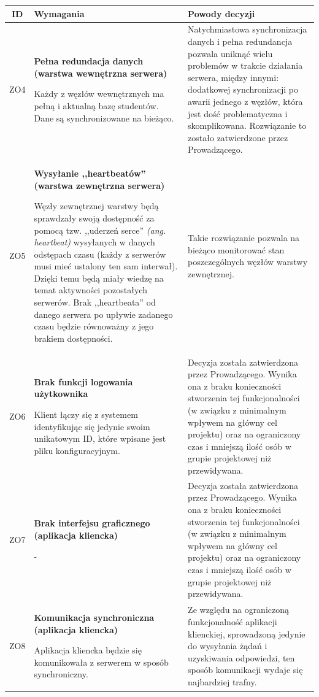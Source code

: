 \pagebreak

\begin{tabularx}{\textwidth}{|c|X|X|}
\hline
\textbf{ID} & \textbf{Wymagania}  & \textbf{Powody decyzji} \\
\hline
\label{z:ZO4} ZO4 &  \textbf{Pełna redundacja danych (warstwa wewnętrzna serwera)}

Każdy z węzłów wewnętrznych ma pełną i aktualną bazę studentów. Dane są synchronizowane na bieżąco. & 
Natychmiastowa synchronizacja danych i pełna redundancja pozwala uniknąć wielu problemów w trakcie działania serwera, między innymi: dodatkowej synchronizacji po awarii jednego z węzłów, która jest dość problematyczna i skomplikowana. Rozwiązanie to zostało zatwierdzone przez Prowadzącego.\\
\hline

\label{z:ZO5} ZO5 &  \textbf{Wysyłanie ,,heartbeatów'' (warstwa zewnętrzna serwera)}

Węzły zewnętrznej warstwy będą sprawdzały swoją dostępność za pomocą tzw. ,,uderzeń serce'' \textit{(ang. heartbeat)} wysyłanych w danych odstępach czasu (każdy z serwerów musi mieć ustalony ten sam interwał). Dzięki temu będą miały wiedzę na temat aktywności pozostałych serwerów. Brak ,,heartbeata'' od danego serwera po upływie zadanego czasu będzie równoważny z jego brakiem dostępności. & 
Takie rozwiązanie pozwala na bieżąco monitorować stan poszczególnych węzłów warstwy zewnętrznej. \\
\hline

\label{z:ZO6} ZO6 &  \textbf{Brak funkcji logowania użytkownika}

Klient łączy się z systemem identyfikując się jedynie swoim unikatowym ID, które wpisane jest pliku konfiguracyjnym. & 
Decyzja została zatwierdzona przez Prowadzącego. Wynika ona z braku konieczności stworzenia tej funkcjonalności (w związku z minimalnym wpływem na główny cel projektu) oraz na ograniczony czas i mniejszą ilość osób w grupie projektowej niż przewidywana.  \\
\hline

\label{z:ZO7} ZO7 &  \textbf{Brak interfejsu graficznego (aplikacja kliencka)}

- & 
Decyzja została zatwierdzona przez Prowadzącego. Wynika ona z braku konieczności stworzenia tej funkcjonalności (w związku z minimalnym wpływem na główny cel projektu) oraz na ograniczony czas i mniejszą ilość osób w grupie projektowej niż przewidywana.
\\
\hline
\label{z:ZO8} ZO8 &  \textbf{Komunikacja synchroniczna (aplikacja kliencka)}

Aplikacja kliencka będzie się komunikowała z serwerem w sposób synchroniczny. & 
Ze względu na ograniczoną funkcjonalność aplikacji klienckiej, sprowadzoną jedynie do wysyłania żądań i uzyskiwania odpowiedzi, ten sposób komunikacji wydaje się najbardziej trafny. \\
\hline

\end{tabularx}

